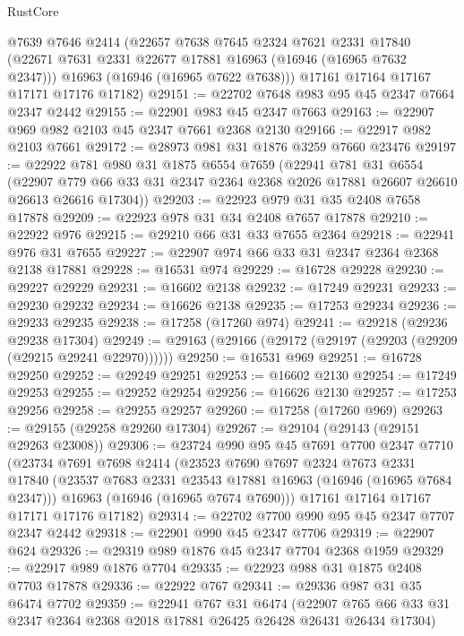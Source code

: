 \begin{lexlean}{RustCore}
\begin{coremodule}
      @7639
      @7646
      @2414
      (@22657
        @7638
        @7645
        @2324
        @7621
        @2331
        @17840
        (@22671 @7631 @2331 @22677 @17881 @16963 (@16946 (@16965 @7632 @2347)))
        @16963
        (@16946 (@16965 @7622 @7638)))
      @17161
      @17164
      @17167
      @17171
      @17176
      @17182)
@29151 := @22702 @7648 @983 @95 @45 @2347 @7664 @2347 @2442
@29155 := @22901 @983 @45 @2347 @7663
@29163 := @22907 @969 @982 @2103 @45 @2347 @7661 @2368 @2130
@29166 := @22917 @982 @2103 @7661
@29172 := @28973 @981 @31 @1876 @3259 @7660 @23476
@29197 := @22922
    @781
    @980
    @31
    @1875
    @6554
    @7659
    (@22941
      @781
      @31
      @6554
      (@22907 @779 @66 @33 @31 @2347 @2364 @2368 @2026 @17881 @26607 @26610 @26613 @26616 @17304))
@29203 := @22923 @979 @31 @35 @2408 @7658 @17878
@29209 := @22923 @978 @31 @34 @2408 @7657 @17878
@29210 := @22922 @976
@29215 := @29210 @66 @31 @33 @7655 @2364
@29218 := @22941 @976 @31 @7655
@29227 := @22907 @974 @66 @33 @31 @2347 @2364 @2368 @2138 @17881
@29228 := @16531 @974
@29229 := @16728 @29228
@29230 := @29227 @29229
@29231 := @16602 @2138
@29232 := @17249 @29231
@29233 := @29230 @29232
@29234 := @16626 @2138
@29235 := @17253 @29234
@29236 := @29233 @29235
@29238 := @17258 (@17260 @974)
@29241 := @29218 (@29236 @29238 @17304)
@29249 := @29163 (@29166 (@29172 (@29197 (@29203 (@29209 (@29215 @29241 @22970))))))
@29250 := @16531 @969
@29251 := @16728 @29250
@29252 := @29249 @29251
@29253 := @16602 @2130
@29254 := @17249 @29253
@29255 := @29252 @29254
@29256 := @16626 @2130
@29257 := @17253 @29256
@29258 := @29255 @29257
@29260 := @17258 (@17260 @969)
@29263 := @29155 (@29258 @29260 @17304)
@29267 := @29104 (@29143 (@29151 @29263 @23008))
@29306 := @23724
    @990
    @95
    @45
    @7691
    @7700
    @2347
    @7710
    (@23734
      @7691
      @7698
      @2414
      (@23523
        @7690
        @7697
        @2324
        @7673
        @2331
        @17840
        (@23537 @7683 @2331 @23543 @17881 @16963 (@16946 (@16965 @7684 @2347)))
        @16963
        (@16946 (@16965 @7674 @7690)))
      @17161
      @17164
      @17167
      @17171
      @17176
      @17182)
@29314 := @22702 @7700 @990 @95 @45 @2347 @7707 @2347 @2442
@29318 := @22901 @990 @45 @2347 @7706
@29319 := @22907 @624
@29326 := @29319 @989 @1876 @45 @2347 @7704 @2368 @1959
@29329 := @22917 @989 @1876 @7704
@29335 := @22923 @988 @31 @1875 @2408 @7703 @17878
@29336 := @22922 @767
@29341 := @29336 @987 @31 @35 @6474 @7702
@29359 := @22941
    @767
    @31
    @6474
    (@22907 @765 @66 @33 @31 @2347 @2364 @2368 @2018 @17881 @26425 @26428 @26431 @26434 @17304)

\end{coremodule}
\end{lexlean}
